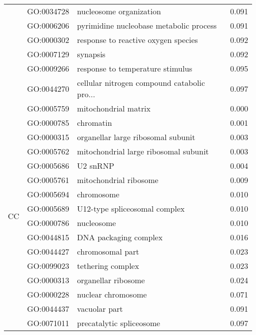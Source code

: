 \begin{longtable}{lllr}
   & GO:0034728 &                      nucleosome organization &         0.091 \\
   & GO:0006206 &      pyrimidine nucleobase metabolic process &         0.091 \\
   & GO:0000302 &          response to reactive oxygen species &         0.092 \\
   & GO:0007129 &                                     synapsis &         0.092 \\
   & GO:0009266 &             response to temperature stimulus &         0.095 \\
   & GO:0044270 &  cellular nitrogen compound catabolic pro... &         0.097 \\
\cline{1-4}
\multirow{17}{*}{CC} & GO:0005759 &                         mitochondrial matrix &         0.000 \\
   & GO:0000785 &                                    chromatin &         0.001 \\
   & GO:0000315 &           organellar large ribosomal subunit &         0.003 \\
   & GO:0005762 &        mitochondrial large ribosomal subunit &         0.003 \\
   & GO:0005686 &                                     U2 snRNP &         0.004 \\
   & GO:0005761 &                       mitochondrial ribosome &         0.009 \\
   & GO:0005694 &                                   chromosome &         0.010 \\
   & GO:0005689 &                U12-type spliceosomal complex &         0.010 \\
   & GO:0000786 &                                   nucleosome &         0.010 \\
   & GO:0044815 &                        DNA packaging complex &         0.016 \\
   & GO:0044427 &                             chromosomal part &         0.023 \\
   & GO:0099023 &                            tethering complex &         0.023 \\
   & GO:0000313 &                          organellar ribosome &         0.024 \\
   & GO:0000228 &                           nuclear chromosome &         0.071 \\
   & GO:0044437 &                                vacuolar part &         0.091 \\
   & GO:0071011 &                     precatalytic spliceosome &         0.097 \\

\end{longtable}
